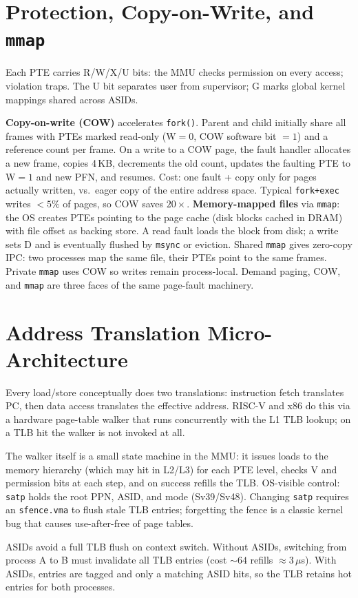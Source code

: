 \section{Protection, Copy-on-Write, and \texttt{mmap}}
Each PTE carries R/W/X/U bits: the MMU checks permission on every access; violation traps. The U bit separates user from supervisor; G marks global kernel mappings shared across ASIDs.

\textbf{Copy-on-write (COW)} accelerates \texttt{fork()}. Parent and child initially share all frames with PTEs marked read-only (W$=0$, COW software bit $=1$) and a reference count per frame. On a write to a COW page, the fault handler allocates a new frame, copies 4\,KB, decrements the old count, updates the faulting PTE to W$=1$ and new PFN, and resumes. Cost: one fault + copy only for pages actually written, vs.\ eager copy of the entire address space. Typical \texttt{fork+exec} writes $<5\%$ of pages, so COW saves $20\times$.
\textbf{Memory-mapped files} via \texttt{mmap}: the OS creates PTEs pointing to the page cache (disk blocks cached in DRAM) with file offset as backing store. A read fault loads the block from disk; a write sets D and is eventually flushed by \texttt{msync} or eviction. Shared \texttt{mmap} gives zero-copy IPC: two processes map the same file, their PTEs point to the same frames. Private \texttt{mmap} uses COW so writes remain process-local. Demand paging, COW, and \texttt{mmap} are three faces of the same page-fault machinery.

\section{Address Translation Micro-Architecture}
Every load/store conceptually does two translations: instruction fetch translates PC, then data access translates the effective address. RISC-V and x86 do this via a hardware page-table walker that runs concurrently with the L1 TLB lookup; on a TLB hit the walker is not invoked at all.

The walker itself is a small state machine in the MMU: it issues loads to the memory hierarchy (which may hit in L2/L3) for each PTE level, checks V and permission bits at each step, and on success refills the TLB. OS-visible control: \texttt{satp} holds the root PPN, ASID, and mode (Sv39/Sv48). Changing \texttt{satp} requires an \texttt{sfence.vma} to flush stale TLB entries; forgetting the fence is a classic kernel bug that causes use-after-free of page tables.

ASIDs avoid a full TLB flush on context switch. Without ASIDs, switching from process A to B must invalidate all TLB entries (cost $\sim 64$ refills $\approx 3$\,$\mu$s). With ASIDs, entries are tagged and only a matching ASID hits, so the TLB retains hot entries for both processes.

